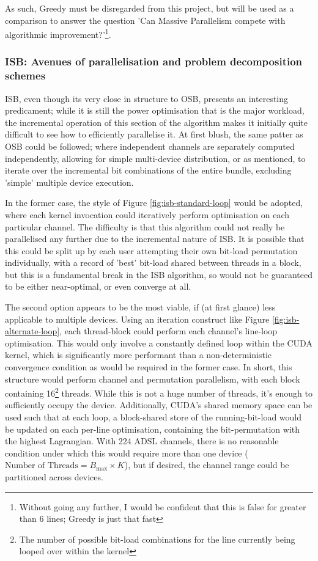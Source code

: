 As such, Greedy must be disregarded from this project, but will be used as a comparison to answer the question 'Can Massive Parallelism compete with algorithmic improvement?'\footnote{Without going any further, I would be confident that this is false for greater than 6 lines; Greedy is just that fast}.

\subsubsection{ISB: Avenues of parallelisation and problem decomposition schemes}
ISB, even though its very close in structure to OSB, presents an interesting predicament; while it is still the power optimisation that is the major workload, the incremental operation of this section of the algorithm makes it initially quite difficult to see how to efficiently parallelise it. At first blush, the same patter as OSB could be followed; where independent channels are separately computed independently, allowing for simple multi-device distribution, or as mentioned, to iterate over the incremental bit combinations of the entire bundle, excluding 'simple' multiple device execution.

In the former case, the style of Figure \ref{fig:isb-standard-loop} would be adopted, where each kernel invocation could iteratively perform optimisation on each particular channel. The difficulty is that this algorithm could not really be parallelised any further due to the incremental nature of ISB. It is possible that this could be split up by each user attempting their own bit-load permutation individually, with a record of 'best' bit-load shared between threads in a block, but this is a fundamental break in the ISB algorithm, so would not be guaranteed to be either near-optimal, or even converge at all.

The second option appears to be the most viable, if (at first glance) less applicable to multiple devices. Using an iteration construct like Figure \ref{fig:isb-alternate-loop}, each thread-block could perform each channel's line-loop optimisation. This would only involve a constantly defined loop within the CUDA kernel, which is significantly more performant than a non-deterministic convergence condition as would be required in the former case. In short, this structure would perform channel and permutation parallelism, with each block containing 16\footnote{The number of possible bit-load combinations for the line currently being looped over within the kernel} threads. While this is not a huge number of threads, it's enough to sufficiently occupy the device. Additionally, CUDA's shared memory space can be used such that at each loop, a block-shared store of the running-bit-load would be updated on each per-line optimisation, containing the bit-permutation with the highest Lagrangian. With 224 ADSL channels, there is no reasonable condition under which this would require more than one device (\(\text{Number of Threads}=B_{\text{max}}\times K\)), but if desired, the channel range could be partitioned across devices.

